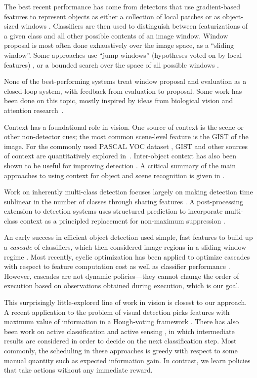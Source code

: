 The best recent performance has come from detectors that use gradient-based features to represent objects as either a collection of local patches or as object-sized windows \cite{Dalal2005,Lowe2004}.
Classifiers are then used to distinguish between featurizations of a given class and all other possible contents of an image window.
Window proposal is most often done exhaustively over the image space, as a ``sliding window''.
Some approaches use ``jump windows'' (hypotheses voted on by local features) \cite{Vedaldi2009,Vijayanarasimhan2011}, or a bounded search over the space of all possible windows \cite{Lampert2008a}.

None of the best-performing systems treat window proposal and evaluation as a closed-loop system, with feedback from evaluation to proposal.
Some work has been done on this topic, mostly inspired by ideas from biological vision and attention research~\cite{Butko2009,Vogel2008}.

Context has a foundational role in vision.
One source of context is the scene or other non-detector cues; the most common scene-level feature is the GIST \cite{Oliva2001a} of the image.
For the commonly used PASCAL VOC dataset \cite{pascal-voc-2010}, GIST and other sources of context are quantitatively explored in~\cite{Divvala2009}. 
Inter-object context has also been shown to be useful for improving detection \cite{Torralba2004}.
A critical summary of the main approaches to using context for object and scene recognition is given in \cite{Galleguillos2010}.

Work on inherently multi-class detection focuses largely on making detection time sublinear in the number of classes through sharing features \cite{Torralba2007,Fan2005}.
A post-processing extension to detection systems uses structured prediction to incorporate multi-class context as a principled replacement for non-maximum suppression \cite{Desai2009}.

An early success in efficient object detection used simple, fast features to build up a \emph{cascade} of classifiers, which then considered image regions in a sliding window regime \cite{Viola2001}.
Most recently, cyclic optimization has been applied to optimize cascades with respect to feature computation cost as well as classifier performance \cite{Chen2012}.
However, cascades are not dynamic policies---they cannot change the order of execution based on observations obtained during execution, which is our goal.

This surprisingly little-explored line of work in vision is closest to our approach.
A recent application to the problem of visual detection picks features with maximum value of information in a Hough-voting framework \cite{Vijayanarasimhan2010}. 
There has also been work on active classification \cite{Gao2011} and active sensing \cite{Yu2009}, in which intermediate results are considered in order to decide on the next classification step.
Most commonly, the scheduling in these approaches is greedy with respect to some manual quantity such as expected information gain.
In contrast, we learn policies that take actions without any immediate reward.
